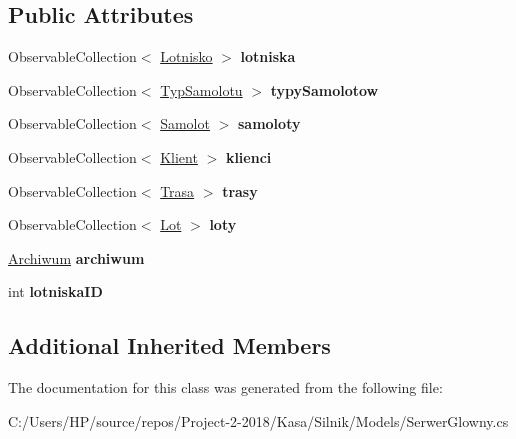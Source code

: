 \subsection*{Public Attributes}
\begin{DoxyCompactItemize}
\item 
\mbox{\label{class_silnik_1_1_serwer_glowny_a997b668c62a862c3ce11968c4a2f9ac4}} 
Observable\+Collection$<$ \mbox{\hyperlink{class_silnik_1_1_lotnisko}{Lotnisko}} $>$ {\bfseries lotniska}
\item 
\mbox{\label{class_silnik_1_1_serwer_glowny_a4ade6e5349d7077c5df7ca5be766be74}} 
Observable\+Collection$<$ \mbox{\hyperlink{class_silnik_1_1_models_1_1_typ_samolotu}{Typ\+Samolotu}} $>$ {\bfseries typy\+Samolotow}
\item 
\mbox{\label{class_silnik_1_1_serwer_glowny_a6f254e519b4d4c940e93771a418ffe9b}} 
Observable\+Collection$<$ \mbox{\hyperlink{class_silnik_1_1_samolot}{Samolot}} $>$ {\bfseries samoloty}
\item 
\mbox{\label{class_silnik_1_1_serwer_glowny_a30df3a2a391e6263c18b4b38a09c2537}} 
Observable\+Collection$<$ \mbox{\hyperlink{class_silnik_1_1_klient}{Klient}} $>$ {\bfseries klienci}
\item 
\mbox{\label{class_silnik_1_1_serwer_glowny_a6c80036c19b7a40b06343367f6c2a700}} 
Observable\+Collection$<$ \mbox{\hyperlink{class_silnik_1_1_trasa}{Trasa}} $>$ {\bfseries trasy}
\item 
\mbox{\label{class_silnik_1_1_serwer_glowny_af876b3228f868008265515c158934f6a}} 
Observable\+Collection$<$ \mbox{\hyperlink{class_silnik_1_1_lot}{Lot}} $>$ {\bfseries loty}
\item 
\mbox{\label{class_silnik_1_1_serwer_glowny_affd101ddff987ad456ed31691ea2197d}} 
\mbox{\hyperlink{class_silnik_1_1_archiwum}{Archiwum}} {\bfseries archiwum}
\item 
\mbox{\label{class_silnik_1_1_serwer_glowny_a85c0286cb27e56fd0ed6b60fd3070bea}} 
int {\bfseries lotniska\+ID}
\end{DoxyCompactItemize}
\subsection*{Additional Inherited Members}


The documentation for this class was generated from the following file\+:\begin{DoxyCompactItemize}
\item 
C\+:/\+Users/\+H\+P/source/repos/\+Project-\/2-\/2018/\+Kasa/\+Silnik/\+Models/Serwer\+Glowny.\+cs\end{DoxyCompactItemize}
